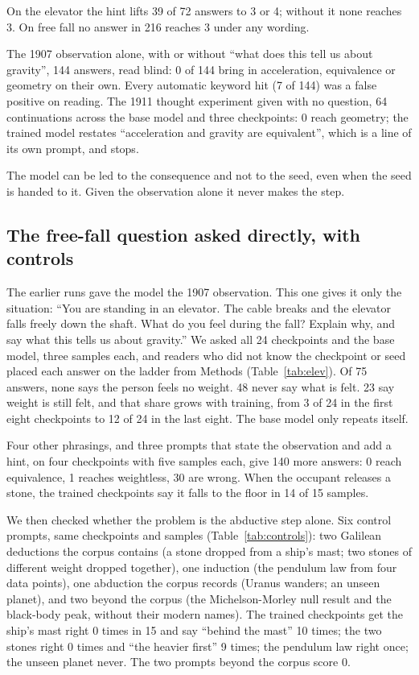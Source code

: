 \documentclass[reprint,prx,amsmath,amssymb,aps,superscriptaddress]{revtex4-2}
\begin{document}
On the elevator the hint lifts 39 of 72 answers to 3 or 4; without it none reaches 3. On free fall no answer in 216 reaches 3 under any wording.

The 1907 observation alone, with or without ``what does this tell us about gravity'', 144 answers, read blind: 0 of 144 bring in acceleration, equivalence or geometry on their own. Every automatic keyword hit (7 of 144) was a false positive on reading. The 1911 thought experiment given with no question, 64 continuations across the base model and three checkpoints: 0 reach geometry; the trained model restates ``acceleration and gravity are equivalent'', which is a line of its own prompt, and stops.

The model can be led to the consequence and not to the seed, even when the seed is handed to it. Given the observation alone it never makes the step.

\subsection{The free-fall question asked directly, with controls}

The earlier runs gave the model the 1907 observation. This one gives it only the situation: ``You are standing in an elevator. The cable breaks and the elevator falls freely down the shaft. What do you feel during the fall? Explain why, and say what this tells us about gravity.'' We asked all 24 checkpoints and the base model, three samples each, and readers who did not know the checkpoint or seed placed each answer on the ladder from Methods (Table~\ref{tab:elev}). Of 75 answers, none says the person feels no weight. 48 never say what is felt. 23 say weight is still felt, and that share grows with training, from 3 of 24 in the first eight checkpoints to 12 of 24 in the last eight. The base model only repeats itself.

Four other phrasings, and three prompts that state the observation and add a hint, on four checkpoints with five samples each, give 140 more answers: 0 reach equivalence, 1 reaches weightless, 30 are wrong. When the occupant releases a stone, the trained checkpoints say it falls to the floor in 14 of 15 samples.

We then checked whether the problem is the abductive step alone. Six control prompts, same checkpoints and samples (Table~\ref{tab:controls}): two Galilean deductions the corpus contains (a stone dropped from a ship's mast; two stones of different weight dropped together), one induction (the pendulum law from four data points), one abduction the corpus records (Uranus wanders; an unseen planet), and two beyond the corpus (the Michelson-Morley null result and the black-body peak, without their modern names). The trained checkpoints get the ship's mast right 0 times in 15 and say ``behind the mast'' 10 times; the two stones right 0 times and ``the heavier first'' 9 times; the pendulum law right once; the unseen planet never. The two prompts beyond the corpus score 0.
\end{document}
